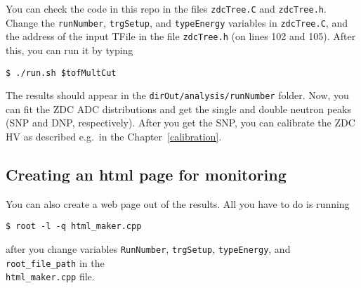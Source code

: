You can check the code in this repo in the files
\texttt{zdcTree.C} and \texttt{zdcTree.h}. Change the \texttt{runNumber}, \texttt{trgSetup},
and \texttt{typeEnergy} variables in \texttt{zdcTree.C}, and
the address of the input TFile in the file \texttt{zdcTree.h} (on lines 102 and 105). After this, you can run it by
typing
\begin{verbatim}
$ ./run.sh $tofMultCut
\end{verbatim}
The results should appear in the \texttt{dirOut/analysis/runNumber} folder. Now, you can fit the ZDC ADC distributions
and get the single and double neutron peaks (SNP and DNP, respectively). After you get the SNP, you can calibrate
the ZDC HV as described e.g.\ in the Chapter~\ref{calibration}.

\subsection{Creating an html page for monitoring}\hypertarget{creating-html-page-for-monitoring}{}\label{creating-html-page-for-monitoring}

You can also create a web page out of the results. All you have to do is running
\begin{verbatim}
$ root -l -q html_maker.cpp
\end{verbatim}
after you change variables \texttt{RunNumber}, \texttt{trgSetup}, \texttt{typeEnergy}, 
and \texttt{root\_file\_path} in the\\
\texttt{html\_maker.cpp} file.

